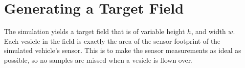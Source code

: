 
% 
\section{Generating a Target Field}
The simulation yields a target field that is of variable height $h$, and width $w$. Each vesicle in the field is exactly the area of the sensor footprint of the simulated vehicle's sensor. This is to make the sensor measurements as ideal as possible, so no samples are missed when a vesicle is flown over.

